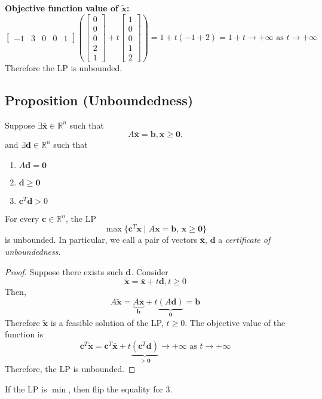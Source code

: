 \textbf{Objective function value of $\tilde{\mathbf{x}}$:}
\[
\begin{bmatrix}
    -1 & 3 & 0 & 0 & 1
\end{bmatrix}
\left(\begin{bmatrix}
    0\\
    0\\
    0\\
    2\\
    1  
\end{bmatrix}
+
t
\begin{bmatrix}
    1\\
    0\\
    0\\
    1\\
    2
\end{bmatrix}\right)
=
1+t(-1+2)=1+t\rightarrow+\infty \text{ as }t\rightarrow+\infty\]
Therefore the LP is unbounded.

\subsection{Proposition (Unboundedness)}
Suppose $\exists \mathbf{\bar{x}}\in\mathbb{R}^n$ such that
\[A\mathbf{\bar{x}}=\mathbf{b}, \mathbf{x}\ge \mathbf{0}.\]
and $\exists\mathbf{d}\in\mathbb{R}^n$ such that
\begin{enumerate}
    \item $A\mathbf{d}=\mathbf{0}$
    \item $\mathbf{d}\ge \mathbf{0}$
    \item $\mathbf{c}^T\mathbf{d}>0$
\end{enumerate}
For every $\mathbf{c}\in\mathbb{R}^n$, the LP
\[\max \{\mathbf{c}^T\mathbf{x} \mid A\mathbf{x}=\mathbf{b}\text{, }
\mathbf{x}\ge\mathbf{0}\}\]
is unbounded. In particular, we call a pair of vectors $\mathbf{\bar{x}}$, $\mathbf{d}$ a
\emph{certificate of unboundedness}.

\begin{proof}
    Suppose there exists such $\mathbf{d}$. Consider
    \[\tilde{\mathbf{x}}=\bar{\mathbf{x}}+t\mathbf{d}, t\ge 0\]
Then,
\[A\tilde{\mathbf{x}}=
\underbrace{A\bar{\mathbf{x}}}_{\mathbf{b}}+
t\underbrace{(A\mathbf{d})}_{\mathbf{0}}=\mathbf{b}\]
Therefore $\tilde{\mathbf{x}}$ is a feasible solution of the LP, $t\ge 0$.
The objective value of the function is
\[\mathbf{c}^T\tilde{\mathbf{x}}=\mathbf{c}^T\bar{\mathbf{x}}+t
\underbrace{(\mathbf{c}^T\mathbf{d})}_{>\mathbf{0}}\rightarrow +\infty\text{ as }t\rightarrow+\infty\]
Therefore, the LP is unbounded.
\end{proof}
\begin{remark}
    If the LP is $\min$, then flip the equality for 3.
\end{remark}

